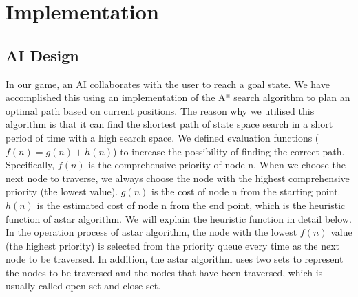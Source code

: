 \documentclass[a4paper]{article}
\begin{document}
\section{Implementation}
\subsection{AI Design}

In our game, an AI collaborates with the user to reach a goal state. We have accomplished this using an implementation of the A* search algorithm to plan an optimal path based on current positions. The reason why we utilised this algorithm is that it can find the shortest path of state space search in a short period of time with a high search space. We defined evaluation functions ($f(n) = g(n) + h(n)$) to increase the possibility of finding the correct path. Specifically, $f(n)$ is the comprehensive priority of node n. When we choose the next node to traverse, we always choose the node with the highest comprehensive priority (the lowest value). $g(n)$ is the cost of node n from the starting point. $h(n)$ is the estimated cost of node n from the end point, which is the heuristic function of astar algorithm. We will explain the heuristic function in detail below. In the operation process of astar algorithm, the node with the lowest $f(n)$ value (the highest priority) is selected from the priority queue every time as the next node to be traversed. In addition, the astar algorithm uses two sets to represent the nodes to be traversed and the nodes that have been traversed, which is usually called open set and close set.\\ \\
\end{document}

